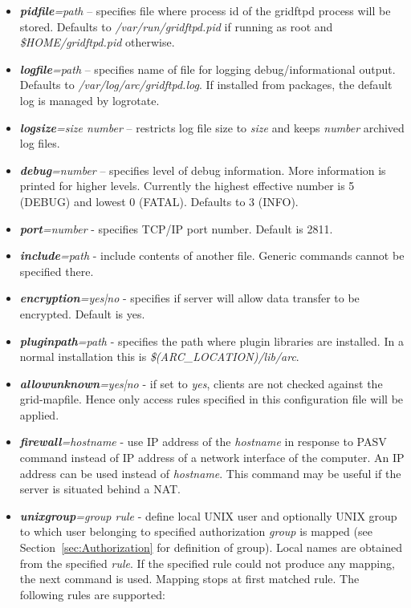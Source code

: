 \documentclass{article}
\begin{document}
\begin{itemize}
\item \textbf{\textit{pidfile}}\textit{=path} -- specifies file where
  process id of the gridftpd process will be stored. Defaults to
  \emph{/var/run/gridftpd.pid} if running as root and
  \emph{\$HOME/gridftpd.pid} otherwise.
\item \textbf{\textit{logfile}}\textit{=path} -- specifies name of file
  for logging debug/informational output. Defaults to
  \emph{/var/log/arc/gridftpd.log}. If installed from packages, the
  default log is managed by logrotate.
\item \textbf{\textit{logsize}}\textit{=size number} -- restricts
  log file size to \emph{size} and keeps \emph{number} archived log
  files.
\item \textbf{\textit{debug}}\textit{=number} -- specifies level of
  debug information. More information is printed for higher
  levels. Currently the highest effective number is 5 (DEBUG) and
  lowest 0 (FATAL). Defaults to 3 (INFO).
\item \textbf{\textit{port}}\textit{=number} - specifies TCP/IP port
  number.  Default is 2811.
\item \textbf{\textit{include}}\textit{=path} - include contents of
  another file. Generic commands cannot be specified there.
\item \textbf{\textit{encryption}}\textit{=yes|no} - specifies if
  server will allow data transfer to be encrypted. Default is yes.
\item \textbf{\textit{pluginpath}}\textit{=path} - specifies the path
  where plugin libraries are installed. In a normal installation this
  is \emph{\$(ARC\_LOCATION)/lib/arc}.
\item \textbf{\textit{allowunknown}}\textit{=yes|no} - if set to
  \emph{yes}, clients are not checked against the grid-mapfile. Hence
  only access rules specified in this configuration file will be
  applied.
\item \textbf{\textit{firewall}}\textit{=hostname} - use IP address of
  the \textit{hostname} in response to PASV command instead of IP
  address of a network interface of the computer. An IP address can be
  used instead of \textit{hostname}. This command may be useful if the
  server is situated behind a NAT.
\item \textbf{\textit{unixgroup}}\textit{=group rule} - define local
  UNIX user and optionally UNIX group to which user belonging to
  specified authorization \textit{group} is mapped (see
  Section~\ref{sec:Authorization} for definition of group). Local
  names are obtained from the specified \textit{rule}. If the
  specified rule could not produce any mapping, the next command is
  used. Mapping stops at first matched rule. The following rules are
  supported:


\end{itemize}
\end{document}
